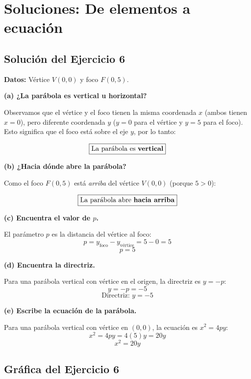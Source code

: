 \documentclass[12pt,a4paper]{article}
\begin{document}

	\section{Soluciones: De elementos a ecuación}

	\subsection*{Solución del Ejercicio 6}

	\textbf{Datos:} Vértice \(V(0,0)\) y foco \(F(0,5)\).

	\bigskip

	\textbf{(a) ¿La parábola es vertical u horizontal?}

	Observamos que el vértice y el foco tienen la misma coordenada \(x\) (ambos tienen \(x=0\)), pero diferente coordenada \(y\) (\(y=0\) para el vértice y \(y=5\) para el foco). Esto significa que el foco está sobre el eje \(y\), por lo tanto:

	\[
	\boxed{\text{La parábola es \textbf{vertical}}}
	\]

	\textbf{(b) ¿Hacia dónde abre la parábola?}

	Como el foco \(F(0,5)\) está \emph{arriba} del vértice \(V(0,0)\) (porque \(5>0\)):

	\[
	\boxed{\text{La parábola abre \textbf{hacia arriba}}}
	\]

	\textbf{(c) Encuentra el valor de \(p\).}

	El parámetro \(p\) es la distancia del vértice al foco:
	\[
	p = y_{\text{foco}} - y_{\text{vértice}} = 5-0=5
	\]
	\[
	\boxed{p=5}
	\]

	\textbf{(d) Encuentra la directriz.}

	Para una parábola vertical con vértice en el origen, la directriz es \(y=-p\):
	\[
	y=-p=-5
	\]
	\[
	\boxed{\text{Directriz: } y=-5}
	\]

	\textbf{(e) Escribe la ecuación de la parábola.}

	Para una parábola vertical con vértice en \((0,0)\), la ecuación es \(x^2=4py\):
	\[
	x^2=4py=4(5)y=20y
	\]
	\[
	\boxed{x^2=20y}
	\]

	\subsection*{Gráfica del Ejercicio 6}
\end{document}
